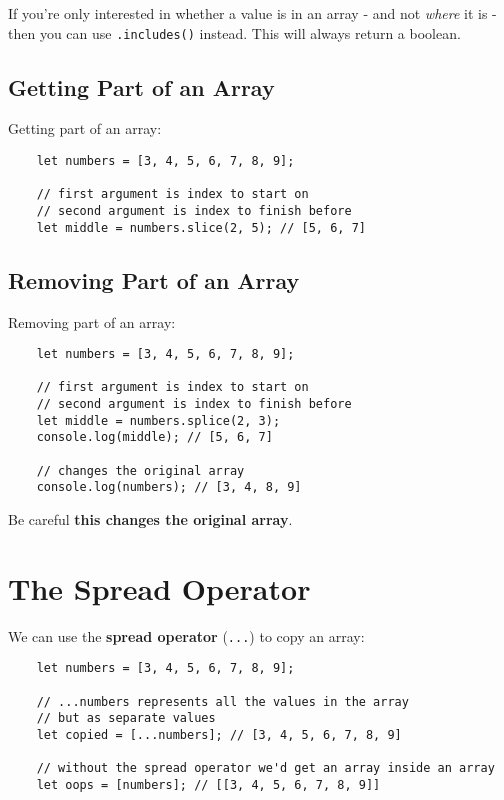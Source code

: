 If you're only interested in whether a value is in an array - and not \textit{where} it is - then you can use \texttt{.includes()} instead. This will always return a boolean.


\subsection{Getting Part of an Array}

Getting part of an array:

\begin{verbatim}
    let numbers = [3, 4, 5, 6, 7, 8, 9];

    // first argument is index to start on
    // second argument is index to finish before
    let middle = numbers.slice(2, 5); // [5, 6, 7]
\end{verbatim}

\subsection{Removing Part of an Array}

Removing part of an array:

\begin{verbatim}
    let numbers = [3, 4, 5, 6, 7, 8, 9];

    // first argument is index to start on
    // second argument is index to finish before
    let middle = numbers.splice(2, 3);
    console.log(middle); // [5, 6, 7]

    // changes the original array
    console.log(numbers); // [3, 4, 8, 9]
\end{verbatim}

Be careful \textbf{this changes the original array}.

\pagebreak

\section{The Spread Operator}

We can use the \textbf{spread operator} (\texttt{...}) to copy an array:

\begin{verbatim}
    let numbers = [3, 4, 5, 6, 7, 8, 9];

    // ...numbers represents all the values in the array
    // but as separate values
    let copied = [...numbers]; // [3, 4, 5, 6, 7, 8, 9]

    // without the spread operator we'd get an array inside an array
    let oops = [numbers]; // [[3, 4, 5, 6, 7, 8, 9]]
\end{verbatim}

